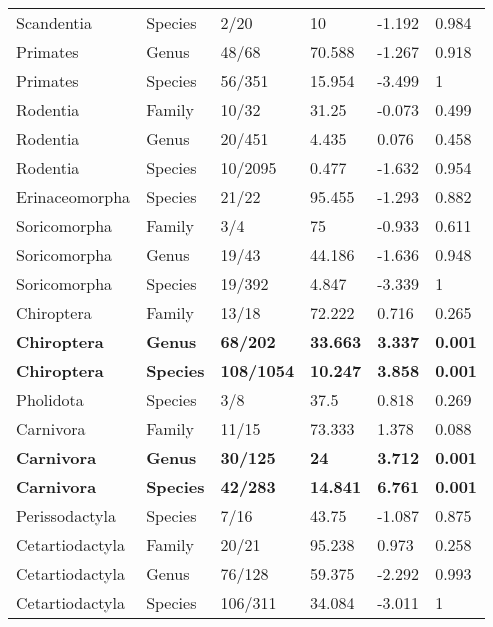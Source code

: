 \begin{longtable}{llllll}
  Scandentia & Species & 2/20 & 10 & -1.192 & 0.984 \\ 
  Primates & Genus & 48/68 & 70.588 & -1.267 & 0.918 \\ 
  Primates & Species & 56/351 & 15.954 & -3.499 & 1 \\ 
  Rodentia & Family & 10/32 & 31.25 & -0.073 & 0.499 \\ 
  Rodentia & Genus & 20/451 & 4.435 & 0.076 & 0.458 \\ 
  Rodentia & Species & 10/2095 & 0.477 & -1.632 & 0.954 \\ 
  Erinaceomorpha & Species & 21/22 & 95.455 & -1.293 & 0.882 \\ 
  Soricomorpha & Family & 3/4 & 75 & -0.933 & 0.611 \\ 
  Soricomorpha & Genus & 19/43 & 44.186 & -1.636 & 0.948 \\ 
  Soricomorpha & Species & 19/392 & 4.847 & -3.339 & 1 \\ 
  Chiroptera & Family & 13/18 & 72.222 & 0.716 & 0.265 \\ 
  \textbf{Chiroptera} & \textbf{Genus} & \textbf{68/202} & \textbf{33.663} & \textbf{3.337} & \textbf{0.001} \\ 
  \textbf{Chiroptera} & \textbf{Species} & \textbf{108/1054} & \textbf{10.247} & \textbf{3.858} & \textbf{0.001} \\ 
  Pholidota & Species & 3/8 & 37.5 & 0.818 & 0.269 \\ 
  Carnivora & Family & 11/15 & 73.333 & 1.378 & 0.088 \\ 
  \textbf{Carnivora} & \textbf{Genus} & \textbf{30/125} & \textbf{24} & \textbf{3.712} & \textbf{0.001} \\ 
  \textbf{Carnivora} & \textbf{Species} & \textbf{42/283} & \textbf{14.841} & \textbf{6.761} & \textbf{0.001} \\ 
  Perissodactyla & Species & 7/16 & 43.75 & -1.087 & 0.875 \\ 
  Cetartiodactyla & Family & 20/21 & 95.238 & 0.973 & 0.258 \\ 
  Cetartiodactyla & Genus & 76/128 & 59.375 & -2.292 & 0.993 \\ 
  Cetartiodactyla & Species & 106/311 & 34.084 & -3.011 & 1 \\ 
   \hline
\hline
\end{longtable}

